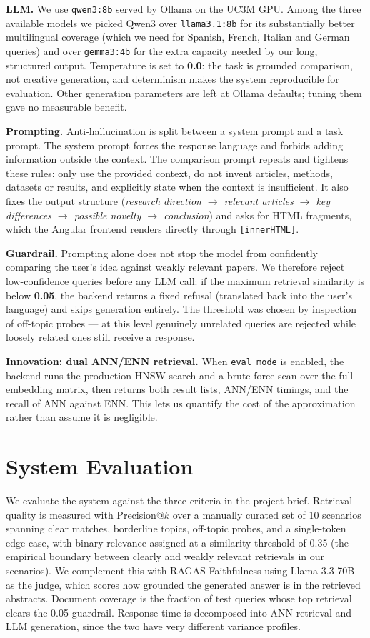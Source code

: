 \documentclass[conference]{IEEEtran}
\begin{document}
\textbf{LLM.} We use \texttt{qwen3:8b} served by Ollama on the UC3M GPU. Among the three available models we picked Qwen3 over \texttt{llama3.1:8b} for its substantially better multilingual coverage (which we need for Spanish, French, Italian and German queries) and over \texttt{gemma3:4b} for the extra capacity needed by our long, structured output. Temperature is set to \textbf{0.0}: the task is grounded comparison, not creative generation, and determinism makes the system reproducible for evaluation. Other generation parameters are left at Ollama defaults; tuning them gave no measurable benefit.

\textbf{Prompting.} Anti-hallucination is split between a system prompt and a task prompt. The system prompt forces the response language and forbids adding information outside the context. The comparison prompt repeats and tightens these rules: only use the provided context, do not invent articles, methods, datasets or results, and explicitly state when the context is insufficient. It also fixes the output structure (\emph{research direction $\rightarrow$ relevant articles $\rightarrow$ key differences $\rightarrow$ possible novelty $\rightarrow$ conclusion}) and asks for HTML fragments, which the Angular frontend renders directly through \texttt{[innerHTML]}.

\textbf{Guardrail.} Prompting alone does not stop the model from confidently comparing the user's idea against weakly relevant papers. We therefore reject low-confidence queries before any LLM call: if the maximum retrieval similarity is below \textbf{0.05}, the backend returns a fixed refusal (translated back into the user's language) and skips generation entirely. The threshold was chosen by inspection of off-topic probes --- at this level genuinely unrelated queries are rejected while loosely related ones still receive a response.

\textbf{Innovation: dual ANN/ENN retrieval.} When \texttt{eval\_mode} is enabled, the backend runs the production HNSW search and a brute-force scan over the full embedding matrix, then returns both result lists, ANN/ENN timings, and the recall of ANN against ENN. This lets us quantify the cost of the approximation rather than assume it is negligible.

\section{System Evaluation}

We evaluate the system against the three criteria in the project brief. Retrieval quality is measured with Precision@$k$ over a manually curated set of 10 scenarios spanning clear matches, borderline topics, off-topic probes, and a single-token edge case, with binary relevance assigned at a similarity threshold of 0.35 (the empirical boundary between clearly and weakly relevant retrievals in our scenarios). We complement this with RAGAS Faithfulness using Llama-3.3-70B as the judge, which scores how grounded the generated answer is in the retrieved abstracts. Document coverage is the fraction of test queries whose top retrieval clears the 0.05 guardrail. Response time is decomposed into ANN retrieval and LLM generation, since the two have very different variance profiles.
\end{document}

